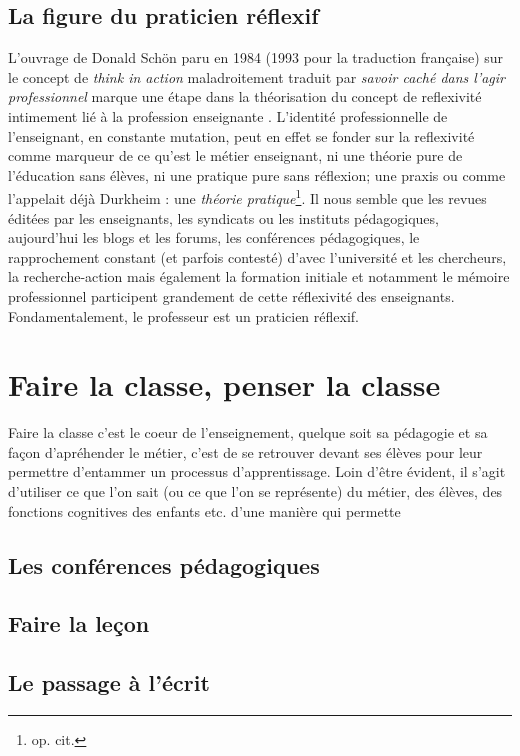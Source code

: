 \documentclass[a4paper,11pt]{article}
\begin{document}
			\subsection{La figure du praticien réflexif}
			L'ouvrage de Donald Schön paru en 1984 (1993 pour la traduction française) sur le concept de \emph{think in action} maladroitement traduit par \emph{savoir caché dans l'agir professionnel} marque une étape dans la théorisation du concept de reflexivité intimement lié à la profession enseignante \cite{sch93}. L'identité professionnelle de l'enseignant, en constante mutation, peut en effet se fonder sur la reflexivité comme marqueur de ce qu'est le métier enseignant, ni une théorie pure de l'éducation sans élèves, ni une pratique pure sans réflexion; une praxis ou comme l'appelait déjà Durkheim : une \emph{théorie pratique}\footnote{op. cit.}. Il nous semble que les revues éditées par les enseignants, les syndicats ou les instituts pédagogiques, aujourd'hui les blogs et les forums, les conférences pédagogiques, le rapprochement constant (et parfois contesté) d'avec l'université et les chercheurs, la recherche-action mais également la formation initiale et notamment le mémoire professionnel participent grandement de cette réflexivité des enseignants. Fondamentalement, le professeur est un praticien réflexif. 
			
\section{Faire la classe, penser la classe}
Faire la classe c'est le coeur de l'enseignement, quelque soit sa pédagogie et sa façon d'apréhender le métier, c'est de se retrouver devant ses élèves pour leur permettre d'entammer un processus d'apprentissage. Loin d'être évident, il s'agit d'utiliser ce que l'on sait (ou ce que l'on se représente) du métier, des élèves, des fonctions cognitives des enfants etc. d'une manière qui permette 

			\subsection{Les conférences pédagogiques}
			\subsection{Faire la leçon}
			\subsection{Le passage à l'écrit}
\end{document}
